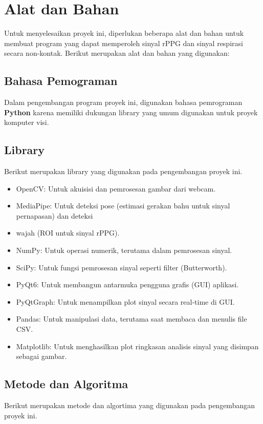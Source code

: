 \documentclass[11pt,a4paper]{article}
\begin{document}
\section{Alat dan Bahan}
     Untuk menyelesaikan proyek ini, diperlukan beberapa alat dan bahan untuk membuat program yang dapat memperoleh sinyal rPPG dan sinyal respirasi secara non-kontak. Berikut merupakan alat dan bahan yang digunakan:
     
\subsection{Bahasa Pemograman}
      Dalam pengembangan program proyek ini, digunakan bahasa pemrograman \textbf{Python} karena memiliki dukungan library yang umum digunakan untuk proyek komputer visi.

\subsection{Library}
     Berikut merupakan library yang digunakan pada pengembangan proyek ini.
\begin{itemize}
    \item OpenCV: Untuk akuisisi dan pemrosesan gambar dari webcam.
    \item MediaPipe: Untuk deteksi pose (estimasi gerakan bahu untuk sinyal pernapasan) dan deteksi \item wajah (ROI untuk sinyal rPPG).
    \item NumPy: Untuk operasi numerik, terutama dalam pemrosesan sinyal.
    \item SciPy: Untuk fungsi pemrosesan sinyal seperti filter (Butterworth).
    \item PyQt6: Untuk membangun antarmuka pengguna grafis (GUI) aplikasi.
    \item PyQtGraph: Untuk menampilkan plot sinyal secara real-time di GUI.
    \item Pandas: Untuk manipulasi data, terutama saat membaca dan menulis file CSV.
    \item Matplotlib: Untuk menghasilkan plot ringkasan analisis sinyal yang disimpan sebagai gambar.
\end{itemize}

\subsection{Metode dan Algoritma}
     Berikut merupakan metode dan algortima yang digunakan pada pengembangan proyek ini.
\end{document}
